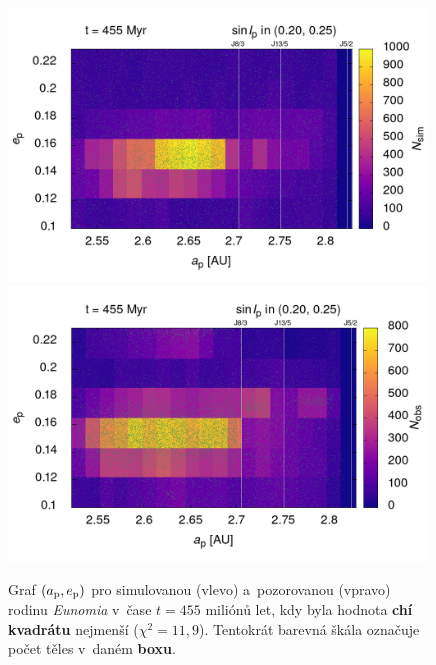 \documentclass{beamer}
\newlength{\vyska}
\newlength{\vyskaC}
\newlength{\side}
\begin{document}
\begin{frame}
\begin{columns}[t]
\begin{column}{\side}
\begin{tcolorbox}[title=Závěry\phantom{Úy},height=0.38\vyskaC]
	\begin{figure}
		\centering
		\includegraphics[width=0.99\textwidth]{../obr/ae_scl_trans.png}\\
		\includegraphics[width=0.99\textwidth]{../obr/ae_obs_trans.png}
		\caption{Graf $(a_{\rm p}, e_{\rm p})$ pro simulovanou (vlevo) a~pozorovanou (vpravo) rodinu \textit{Eunomia} v~čase $t=455$ miliónů let, kdy byla hodnota \textbf{chí kvadrátu} nejmenší ($\chi^2=11,9$). Tentokrát barevná škála označuje počet těles v~daném \textbf{boxu}.}
	\end{figure}


\end{tcolorbox}
\end{column}
\end{columns}
\end{frame}
\end{document}

